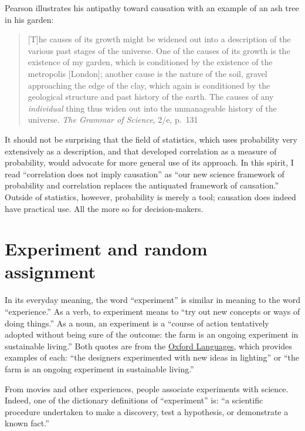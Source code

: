 \documentclass[
  letterpaper,
  DIV=11,
  numbers=noendperiod,
  oneside]{scrreprt}
\begin{document}
Pearson illustrates his antipathy toward causation with an example of an
ash tree in his garden:

\begin{quote}
{[}T{]}he causes of its growth might be widened out into a description
of the various past stages of the universe. One of the causes of its
growth is the existence of my garden, which is conditioned by the
existence of the metropolis {[}London{]}; another cause is the nature of
the soil, gravel approaching the edge of the clay, which again is
conditioned by the geological structure and past history of the earth.
The causes of any \emph{individual} thing thus widen out into the
unmanageable history of the universe. \emph{The Grammar of Science},
2/e, p.~131
\end{quote}

It should not be surprising that the field of statistics, which uses
probability very extensively as a description, and that developed
correlation as a measure of probability, would advocate for more general
use of its approach. In this spirit, I read ``correlation does not imply
causation'' as ``our new science framework of probability and
correlation replaces the antiquated framework of causation.'' Outside of
statistics, however, probability is merely a tool; causation does indeed
have practical use. All the more so for decision-makers.

\hypertarget{sec-lesson-32}{%
\chapter{Experiment and random assignment}\label{sec-lesson-32}}

In its everyday meaning, the word ``experiment'' is similar in meaning
to the word ``experience.'' As a verb, to experiment means to ``try out
new concepts or ways of doing things.'' As a noun, an experiment is a
``course of action tentatively adopted without being sure of the
outcome: the farm is an ongoing experiment in sustainable living.'' Both
quotes are from the
\href{https://languages.oup.com/google-dictionary-en/}{Oxford
Languages}, which provides examples of each: ``the designers
experimented with new ideas in lighting'' or ``the farm is an ongoing
experiment in sustainable living.''

From movies and other experiences, people associate experiments with
science. Indeed, one of the dictionary definitions of ``experiment'' is:
``a scientific procedure undertaken to make a discovery, test a
hypothesis, or demonstrate a known fact.''
\end{document}
